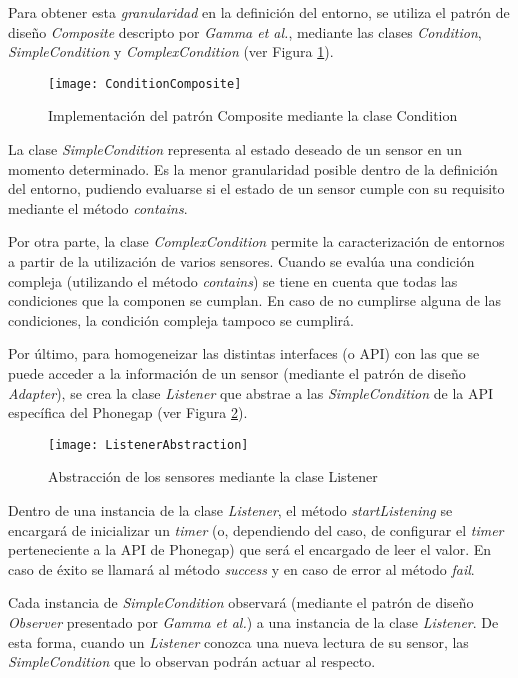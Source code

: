 Para obtener esta \emph{granularidad} en la definición del entorno, se utiliza el patrón de diseño \emph{Composite} descripto por \emph{Gamma et al.}\cite{Gamma95}, mediante las clases \emph{Condition}, \emph{SimpleCondition} y \emph{ComplexCondition} (ver Figura \ref{CompositeCondition}).

\begin{figure}[ht!]
\centering
\texttt{[image: ConditionComposite]}
\caption{Implementación del patrón Composite mediante la clase Condition}
\label{CompositeCondition}
\end{figure}

La clase \emph{SimpleCondition} representa al estado deseado de un sensor en un momento determinado. Es la menor granularidad posible dentro de la definición del entorno, pudiendo evaluarse si el estado de un sensor cumple con su requisito mediante el método \emph{contains}.

Por otra parte, la clase \emph{ComplexCondition} permite la caracterización de entornos a partir de la utilización de varios sensores. Cuando se evalúa una condición compleja (utilizando el método \emph{contains}) se tiene en cuenta que todas las condiciones que la componen se cumplan. En caso de no cumplirse alguna de las condiciones, la condición compleja tampoco se cumplirá.

Por último, para homogeneizar las distintas interfaces (o API) con las que se puede acceder a la información de un sensor (mediante el patrón de diseño \emph{Adapter}\cite{Gamma95}), se crea la clase \emph{Listener} que abstrae a las \emph{SimpleCondition} de la API específica del Phonegap (ver Figura \ref{ListenerAbstraction}).

\begin{figure}[ht!]
\centering
\texttt{[image: ListenerAbstraction]}
\caption{Abstracción de los sensores mediante la clase Listener}
\label{ListenerAbstraction}
\end{figure}

Dentro de una instancia de la clase \emph{Listener}, el método \emph{startListening} se encargará de inicializar un \emph{timer} (o, dependiendo del caso, de configurar el \emph{timer} perteneciente a la API de Phonegap) que será el encargado de leer el valor. En caso de éxito se llamará al método \emph{success} y en caso de error al método \emph{fail}.

Cada instancia de \emph{SimpleCondition} observará (mediante el patrón de diseño \emph{Observer} presentado por \emph{Gamma et al.}\cite{Gamma95}) a una instancia de la clase \emph{Listener}. De esta forma, cuando un \emph{Listener} conozca una nueva lectura de su sensor, las \emph{SimpleCondition} que lo observan podrán actuar al respecto.

